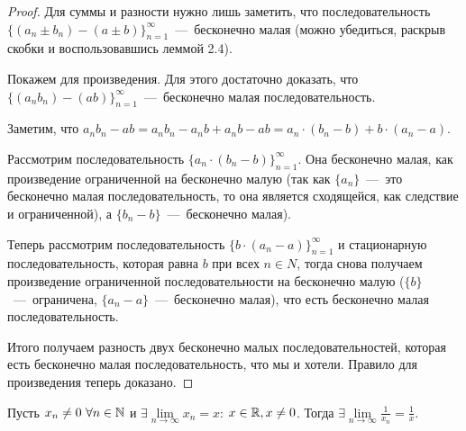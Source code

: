\begin{proof}
    Для суммы и разности нужно лишь заметить, что последовательность $\{ (a_{n} \pm b_{n}) - (a \pm b)\}^{\infty}_{n = 1}$~---~бесконечно малая (можно убедиться, раскрыв скобки и воспользовавшись леммой 2.4).

    Покажем для произведения. Для этого достаточно доказать, что $\{ (a_{n} b_{n}) - (a b)\}^{\infty}_{n = 1}$~---~бесконечно малая последовательность.

    Заметим, что $a_{n} b_{n} - a b = a_{n} b_{n} - a_{n} b + a_{n} b - ab = a_{n} \cdot (b_{n} - b) + b \cdot (a_{n} - a)$.

    Рассмотрим последовательность $\{ a_{n} \cdot (b_{n} - b) \}^{\infty}_{n = 1}$. Она бесконечно малая, как произведение ограниченной на бесконечно малую (так как $\{ a_{n} \}$~---~это бесконечно малая последовательность, то она является сходящейся, как следствие и ограниченной), а $\{ b_{n} - b \}$~---~бесконечно малая).

    Теперь рассмотрим последовательность $\{ b \cdot (a_{n} - a) \}^{\infty}_{n = 1}$ и стационарную последовательность, которая равна $b$ при всех $n \in N$, тогда снова получаем произведение ограниченной последовательности на бесконечно малую ($\{ b \}$~---~ограничена, $\{ a_{n}-a \}$~---~бесконечно малая), что есть бесконечно малая последовательность.

    Итого получаем разность двух бесконечно малых последовательностей, которая есть бесконечно малая последовательность, что мы и хотели. Правило для произведения теперь доказано.
\end{proof}
\begin{lemma}
    Пусть $x_{n} \neq 0 \  \forall n \in \mathbb{N}$ и $\exists \lim\limits_{n\to \infty} x_{n} = x$: $x \in \mathbb{R}, x \neq 0$. Тогда $\displaystyle \exists \lim\limits_{n\to \infty} \frac{1}{x_{n}} = \frac{1}{x}$.
\end{lemma}
